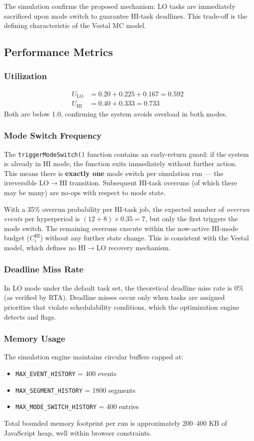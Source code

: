 \documentclass[conference]{IEEEtran}
\begin{document}
The simulation confirms the proposed mechanism: LO tasks are immediately sacrificed upon mode switch to guarantee HI-task deadlines. This trade-off is the defining characteristic of the Vestal MC model.

\subsection{Performance Metrics}

\subsubsection{Utilization}
\begin{align}
  U_{\text{LO}} &= 0.20 + 0.225 + 0.167 = 0.592 \\
  U_{\text{HI}} &= 0.40 + 0.333 = 0.733
\end{align}
Both are below 1.0, confirming the system avoids overload in both modes.

\subsubsection{Mode Switch Frequency}
The \texttt{triggerModeSwitch()} function contains an early-return guard: if the system is already in HI mode, the function exits immediately without further action. This means there is \textbf{exactly one} mode switch per simulation run --- the irreversible LO$\rightarrow$HI transition. Subsequent HI-task overruns (of which there may be many) are no-ops with respect to mode state.

With a 35\% overrun probability per HI-task job, the expected number of \textit{overrun events} per hyperperiod is $(12+8) \times 0.35 = 7$, but only the first triggers the mode switch. The remaining overruns execute within the now-active HI-mode budget ($C_i^{\text{HI}}$) without any further state change. This is consistent with the Vestal model, which defines no HI$\rightarrow$LO recovery mechanism.

\subsubsection{Deadline Miss Rate}
In LO mode under the default task set, the theoretical deadline miss rate is 0\% (as verified by RTA). Deadline misses occur only when tasks are assigned priorities that violate schedulability conditions, which the optimization engine detects and flags.

\subsubsection{Memory Usage}
The simulation engine maintains circular buffers capped at:
\begin{itemize}
  \item \texttt{MAX\_EVENT\_HISTORY} = 400 events
  \item \texttt{MAX\_SEGMENT\_HISTORY} = 1800 segments
  \item \texttt{MAX\_MODE\_SWITCH\_HISTORY} = 400 entries
\end{itemize}
Total bounded memory footprint per run is approximately 200--400 KB of JavaScript heap, well within browser constraints.
\end{document}
